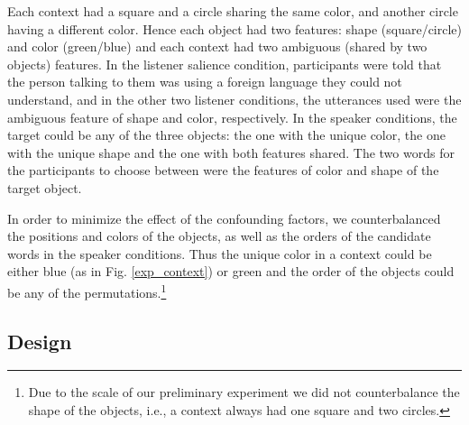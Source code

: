 Each context had a square and a circle sharing the same color, and
another circle having a different color. Hence each object had two
features: shape (square/circle) and color (green/blue) and each
context had two ambiguous (shared by two objects) features. In the
listener salience condition, participants were told that the person
talking to them was using a foreign language they could not
understand, and in the other two listener conditions, the utterances
used were the ambiguous feature of shape and color, respectively. In
the speaker conditions, the target could be any of the three objects:
the one with the unique color, the one with the unique shape and the
one with both features shared. The two words for the participants to
choose between were the features of color and shape of the target
object.

In order to minimize the effect of the confounding factors, we
counterbalanced the positions and colors of the objects, as well as
the orders of the candidate words in the speaker conditions. Thus the
unique color in a context could be either blue (as in
Fig. \ref{exp_context}) or green and the order of the objects could be
any of the permutations.\footnote{Due to the scale of our preliminary
  experiment we did not counterbalance the shape of the objects, i.e.,
  a context always had one square and two circles.}

\subsection*{Design}

